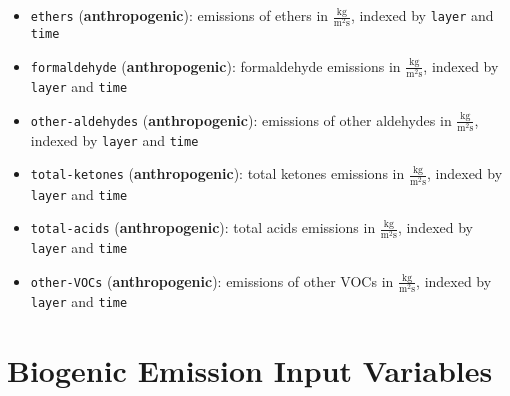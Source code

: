 \begin{itemize}
    \item \texttt{ethers} (\textbf{anthropogenic}): emissions of ethers in $\frac{\text{kg}}{\text{m}^2 \text{s}}$, indexed by \texttt{layer} and \texttt{time}
    \item \texttt{formaldehyde} (\textbf{anthropogenic}): formaldehyde emissions in $\frac{\text{kg}}{\text{m}^2 \text{s}}$, indexed by \texttt{layer} and \texttt{time}
    \item \texttt{other-aldehydes} (\textbf{anthropogenic}): emissions of other aldehydes in $\frac{\text{kg}}{\text{m}^2 \text{s}}$, indexed by \texttt{layer} and \texttt{time}
    \item \texttt{total-ketones} (\textbf{anthropogenic}): total ketones emissions in $\frac{\text{kg}}{\text{m}^2 \text{s}}$, indexed by \texttt{layer} and \texttt{time}
    \item \texttt{total-acids} (\textbf{anthropogenic}): total acids emissions in $\frac{\text{kg}}{\text{m}^2 \text{s}}$, indexed by \texttt{layer} and \texttt{time}
    \item \texttt{other-VOCs} (\textbf{anthropogenic}): emissions of other VOCs in $\frac{\text{kg}}{\text{m}^2 \text{s}}$, indexed by \texttt{layer} and \texttt{time}
\end{itemize}

\section{Biogenic Emission Input Variables}

